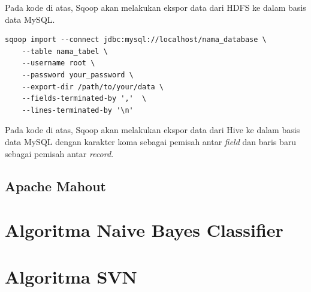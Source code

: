 Pada kode di atas, Sqoop akan melakukan ekspor data dari HDFS ke dalam basis data MySQL.

\begin{lstlisting}[caption=Perintah Ekspor Sqoop dari Hive ke Basis Data MySQL]
	sqoop import --connect jdbc:mysql://localhost/nama_database \
	--table nama_tabel \ 
	--username root \
	--password your_password \
	--export-dir /path/to/your/data \
	--fields-terminated-by ','  \
	--lines-terminated-by '\n'
\end{lstlisting}

Pada kode di atas, Sqoop akan melakukan ekspor data dari Hive ke dalam basis data MySQL dengan karakter koma sebagai pemisah antar \textit{field} dan baris baru sebagai pemisah antar \textit{record}.

\subsection{Apache Mahout}
\label{sec:apache_mahout}

\section{Algoritma Naive Bayes Classifier}
\label{sec:algoritma_naive_bayes}

\section{Algoritma SVN}
\label{sec:algoritma_svn}